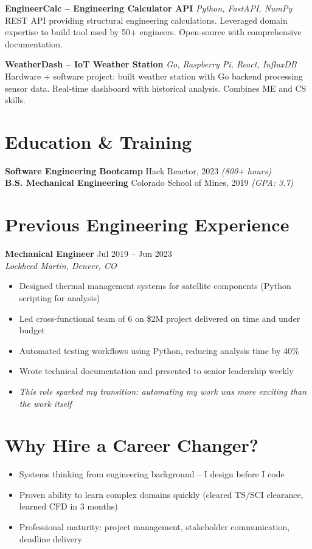 \documentclass[11pt,a4paper]{article}
\begin{document}
\noindent\textbf{EngineerCalc -- Engineering Calculator API} \hfill \textit{Python, FastAPI, NumPy}\\
{\small REST API providing structural engineering calculations. Leveraged domain expertise to build tool used by 50+ engineers. Open-source with comprehensive documentation.}
\vspace{0.4em}

\noindent\textbf{WeatherDash -- IoT Weather Station} \hfill \textit{Go, Raspberry Pi, React, InfluxDB}\\
{\small Hardware + software project: built weather station with Go backend processing sensor data. Real-time dashboard with historical analysis. Combines ME and CS skills.}

\section{Education \& Training}
\noindent\textbf{Software Engineering Bootcamp} \hfill Hack Reactor, 2023 \textit{(800+ hours)}\\
\textbf{B.S. Mechanical Engineering} \hfill Colorado School of Mines, 2019 \textit{(GPA: 3.7)}

\section{Previous Engineering Experience}

\noindent\textbf{Mechanical Engineer} \hfill \textcolor{accent}{Jul 2019 -- Jun 2023}\\
\textit{Lockheed Martin, Denver, CO}
\begin{itemize}[leftmargin=1.2em,nosep,label={\color{accent}\textbullet}]
\item Designed thermal management systems for satellite components (Python scripting for analysis)
\item Led cross-functional team of 6 on \$2M project delivered on time and under budget
\item Automated testing workflows using Python, reducing analysis time by 40\%
\item Wrote technical documentation and presented to senior leadership weekly
\item \textit{This role sparked my transition: automating my work was more exciting than the work itself}
\end{itemize}

\section{Why Hire a Career Changer?}
\begin{itemize}[leftmargin=1.2em,nosep,label={\color{accent}\textbullet}]
\item Systems thinking from engineering background -- I design before I code
\item Proven ability to learn complex domains quickly (cleared TS/SCI clearance, learned CFD in 3 months)
\item Professional maturity: project management, stakeholder communication, deadline delivery
\end{itemize}
\end{document}
